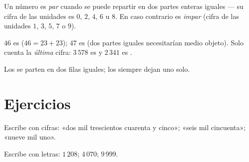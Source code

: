 \begin{definition}\label{def:g3:numbers:evenodd}
Un número es \emph{par} cuando se puede repartir en
dos partes enteras iguales --- su cifra de las unidades es $0$, $2$, $4$, $6$ u
$8$. En caso contrario es \emph{impar} (cifra de las unidades $1$,
$3$, $5$, $7$ o $9$).
\end{definition}

\begin{example}
$46$ es  ($46 = 23 + 23$); $47$ es  (dos partes iguales
necesitarían medio objeto). Solo cuenta la \emph{última} cifra: $3\,578$ es
 y $2\,341$ es .
\end{example}

\begin{omfigure}

{\small Los  se parten en dos filas iguales; los  siempre
dejan uno solo.}
\end{omfigure}

\section{Ejercicios}

\begin{exercise}[$\star$]\label{exo:g3:numbers:1}
Escribe con cifras: «dos mil trescientos cuarenta y cinco»; «seis
mil cincuenta»; «nueve mil uno».
\end{exercise}

\begin{exercise}[$\star$]\label{exo:g3:numbers:2}
Escribe con letras: $1\,208$; \quad $4\,070$; \quad $9\,999$.
\end{exercise}

